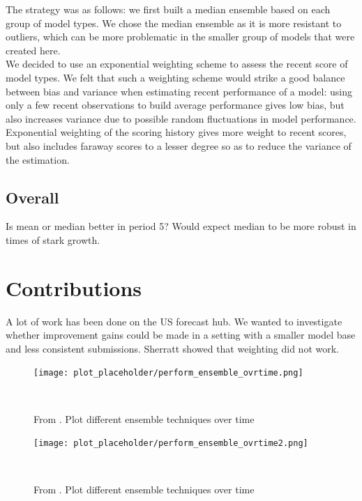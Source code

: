 The strategy was as follows: we first built a median ensemble based on each group of model types. We chose the median ensemble as it is more resistant to outliers, which can be more problematic in the smaller group of models that were created here.\\
We decided to use an exponential weighting scheme to assess the recent score of model types. We felt that such a weighting scheme would strike a good balance between bias and variance when estimating recent performance of a model: using only a few recent observations to build average performance gives low bias, but also increases variance due to possible random fluctuations in model performance. Exponential weighting of the scoring history gives more weight to recent scores, but also includes faraway scores to a lesser degree so as to reduce the variance of the estimation.\\
\subsection{Overall}
Is mean or median better in period 5? Would expect median to be more robust in times of stark growth.
\section{Contributions}
A lot of work has been done on the US forecast hub. We wanted to investigate whether improvement gains could be made in a setting with a smaller model base and less consistent submissions. Sherratt showed that weighting did not work.
\begin{figure}
\centering
\texttt{[image: plot\_placeholder/perform\_ensemble\_ovrtime.png]}
\caption{From \cite{ray_ensemble_2020}. Plot different ensemble techniques over time}
\
\end{figure}
\begin{figure}
\centering
\texttt{[image: plot\_placeholder/perform\_ensemble\_ovrtime2.png]}
\caption{From \cite{ray_ensemble_2020}. Plot different ensemble techniques over time}
\
\end{figure}


